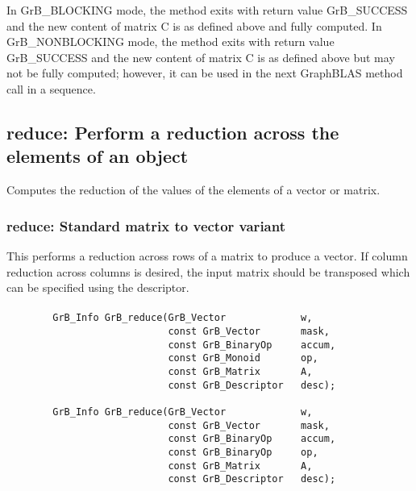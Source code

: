 In {\sf GrB\_BLOCKING} mode, the method exits with return value 
{\sf GrB\_SUCCESS} and the new content of matrix {\sf C} is as defined above
and fully computed.  
In {\sf GrB\_NONBLOCKING} mode, the method exits with return value 
{\sf GrB\_SUCCESS} and the new content of matrix {\sf C} is as defined above 
but may not be fully computed; however, it can be used in the next GraphBLAS 
method call in a sequence.


\subsection{{\sf reduce}: Perform a reduction across the elements of an object}

Computes the reduction of the values of the elements of a vector or matrix.

\subsubsection{{\sf reduce}: Standard matrix to vector variant}

This performs a reduction across rows of a matrix to produce a vector.  If column reduction across columns is desired, the input matrix should be transposed which can be specified using the descriptor.

\paragraph{\syntax}

\begin{verbatim}
        GrB_Info GrB_reduce(GrB_Vector             w,
                            const GrB_Vector       mask,
                            const GrB_BinaryOp     accum,
                            const GrB_Monoid       op,  
                            const GrB_Matrix       A,
                            const GrB_Descriptor   desc);
                            
        GrB_Info GrB_reduce(GrB_Vector             w,
                            const GrB_Vector       mask,
                            const GrB_BinaryOp     accum,
                            const GrB_BinaryOp     op,  
                            const GrB_Matrix       A,
                            const GrB_Descriptor   desc);
\end{verbatim}


